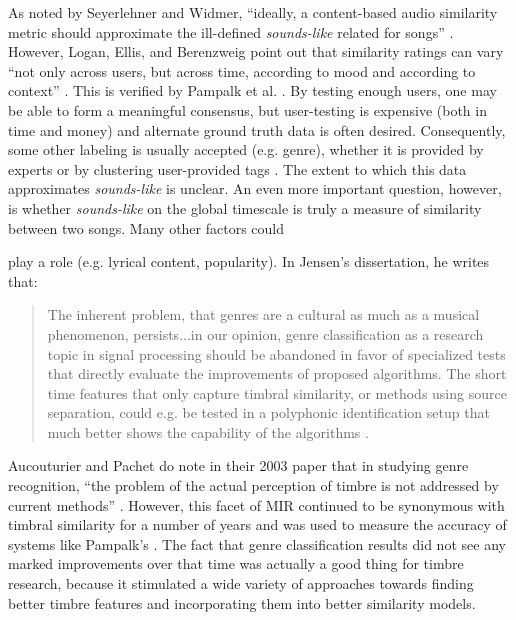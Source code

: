\documentclass[12pt]{report} 	%
\numberwithin{figure}{chapter}
\numberwithin{table}{chapter}
\numberwithin{equation}{chapter}
\begin{document}
\begin{flushleft}
As noted by Seyerlehner and Widmer, ``ideally, a content-based audio similarity metric should approximate the ill-defined \textit{sounds-like} related for songs'' \cite[p. 1]{Seyerlehner:2008tw}. However, Logan, Ellis, and Berenzweig point out that similarity ratings can vary ``not only across users, but across time, according to mood and according to context'' \cite[p. 1]{Logan:2003cr}. This is verified by Pampalk et al. \cite[p. 6]{Pampalk:2008xz}. By testing enough users, one may be able to form a meaningful consensus, but user-testing is expensive (both in time and money) and alternate ground truth data is often desired. Consequently, some other labeling is usually accepted (e.g. genre), whether it is provided by experts or by clustering user-provided tags \cite[p. 2]{Logan:2003cr}. The extent to which this data approximates \textit{sounds-like} is unclear. An even more important question, however, is whether \textit{sounds-like} on the global timescale is truly a measure of similarity between two songs. Many other factors could \begin{singlespace}
\noindent play a role (e.g. lyrical content, popularity). In Jensen's dissertation, he writes that:
\selectfont
\begin{quote} The inherent problem, that genres are a cultural as much as a musical phenomenon, persists...in our opinion, genre classification as a research topic in signal processing should be abandoned in favor of specialized tests that directly evaluate the improvements of proposed algorithms. The short time features that only capture timbral similarity, or methods using source separation, could e.g. be tested in a polyphonic identification setup that much better shows the capability of the algorithms \cite[p. 11]{Jensen:2009ta}.
\end{quote}
\selectfont
\end{singlespace}
Aucouturier and Pachet do note in their 2003 paper that in studying genre recognition, ``the problem of the actual perception of timbre is not addressed by current methods'' \cite[p. 16]{Aucouturier:2003gs}. However, this facet of MIR continued to be synonymous with timbral similarity for a number of years and was used to measure the accuracy of systems like Pampalk's \cite{Pampalk:2006pr}. The fact that genre classification results did not see any marked improvements over that time was actually a good thing for timbre research, because it stimulated a wide variety of approaches towards finding better timbre features and incorporating them into better similarity models.


\end{flushleft}
\end{document}
